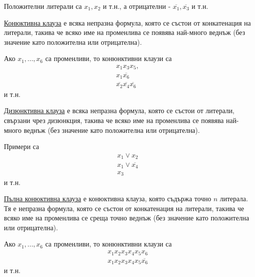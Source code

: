 \begin{example}
    Положителни литерали са \(x_1, x_2\) и т.н., а отрицателни - \(\overline{x_1}, \overline{x_3}\) и т.н.
\end{example}

\begin{definition}
    \underline{Конюктивна клауза} е всяка непразна формула, която се състои от конкатенация на литерали, 
    такива че всяко име на променлива се появява най-много веднъж (без значение като положителна или 
    отрицателна).
\end{definition}

\begin{example}
    Ако \(x_1, ..., x_6\) са променливи, то конюнктивни клаузи са 
    \begin{align*}
        x_1x_3x_5, \\
        x_1\overline{x_6} \\
        \overline{x_2}\overline{x_4}\overline{x_6}
    \end{align*} и т.н.
\end{example}

\begin{definition}
    \underline{Дизюнктивна клауза} е всяка непразна формула, която се състои от литерали, свързани 
    чрез дизюнкция, такива че всяко име на променлива се появява най-много веднъж (без значение 
    като положителна или отрицателна).
\end{definition}

\begin{example}
    Примери са
    \begin{align*}
        x_1 \vee x_2 \\
        x_1 \vee \overline{x_4} \\
        x_3
    \end{align*} и т.н.
\end{example}

\begin{definition}
    \underline{Пълна конюктивна клауза} е конюктивна клауза, която съдържа точно \(n\) литерала. Тя е 
    непразна формула, която се състои от конкатенация на литерали, такива че всяко име на променлива се 
    среща точно веднъж (без значение като положителна или отрицателна).
\end{definition}

\begin{example}
    Ако \(x_1, ..., x_6\) са променливи, то конюнктивни клаузи са 
    \begin{align*}
        x_1x_2x_3x_4x_5x_6 \\
        x_1x_2x_3x_4x_5\overline{x_6}
    \end{align*} и т.н.
\end{example}

